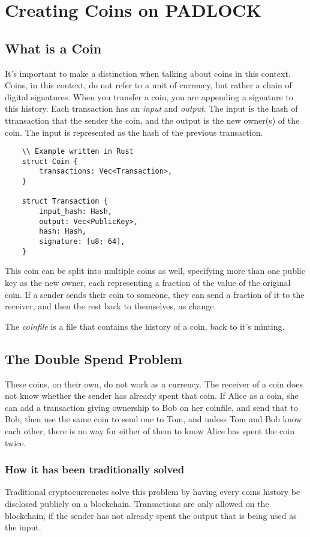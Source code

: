 \documentclass[12pt, letterpaper]{article}
\begin{document}
\section{Creating Coins on PADLOCK}

\subsection{What is a Coin}
It's important to make a distinction when talking about coins in this context.
Coins, in this context, do not refer to a unit of currency, but rather a chain
of digital signatures. When you transfer a coin, you are appending a signature
to this history. Each transaction has an \textit{input} and \textit{output}. The
input is the hash of ttransaction that the sender the coin, and the output is the new
owner(s) of the coin. The input is represented as the hash of the previous
transaction.

\begin{verbatim}
    \\ Example written in Rust
    struct Coin {
        transactions: Vec<Transaction>,
    }
    
    struct Transaction {
        input_hash: Hash,
        output: Vec<PublicKey>,
        hash: Hash,
        signature: [u8; 64],
    }
\end{verbatim}

This coin can be split into multiple coins as well, specifying more than one
public key as the new owner, each representing a fraction of the value of the
original coin. If a sender sends their coin to someone, they can send a fraction
of it to the receiver, and then the rest back to themselves, as change.

The \textit{coinfile} is a file that contains the history of a coin, back to
it's minting.


\subsection{The Double Spend Problem}
These coins, on their own, do not work as a currency. The receiver of a coin
does not know whether the sender has already spent that coin. If Alice as a
coin, she can add a transaction giving ownership to Bob on her coinfile, and
send that to Bob, then use the same coin to send one to Tom, and unless Tom and
Bob know each other, there is no way for either of them to know Alice has spent
the coin twice.

\subsubsection{How it has been traditionally solved}
Traditional cryptocurrencies solve this problem by having every coins history be
disclosed publicly on a blockchain. Transactions are only allowed on the
blockchain, if the sender has not already spent the output that is being used as
the input.
\end{document}
